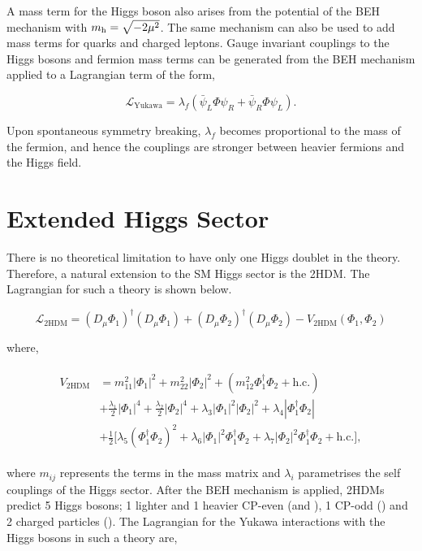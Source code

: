 A mass term for the Higgs boson also arises from the potential of the \ac{BEH} mechanism with $m_{{\text{h}}} = \sqrt{-2\mu^2}$. 
The same mechanism can also be used to add mass terms for quarks and charged leptons.
Gauge invariant couplings to the Higgs bosons and fermion mass terms can be generated from the \ac{BEH} mechanism applied to a Lagrangian term of the form,

\begin{equation}
\mathcal{L}_{\text{Yukawa}} = \lambda_f (\bar{\psi}_{L}\Phi\psi_{R} + \bar{\psi}_{R}\Phi\psi_{L}).
\end{equation}

Upon spontaneous symmetry breaking, $\lambda_{f}$ becomes proportional to the mass of the fermion, and hence the couplings are stronger between heavier fermions and the Higgs field.

\section{Extended Higgs Sector}

There is no theoretical limitation to have only one Higgs doublet in the theory.
Therefore, a natural extension to the \ac{SM} Higgs sector is the \ac{2HDM}.
The Lagrangian for such a theory is shown below.

\begin{equation}
\mathcal{L}_{\text{2HDM}} = (D_\mu \Phi_1)^{\dagger} (D_\mu \Phi_1) + (D_\mu \Phi_2)^{\dagger} (D_\mu \Phi_2) - V_{\text{2HDM}}(\Phi_1 ,\Phi_2)
\end{equation}

where,

\begin{align}
\begin{split}
V_{\text{2HDM}} &= m_{11}^{2}|\Phi_{1}|^2 + m_{22}^{2}|\Phi_{2}|^2 + (m_{12}^{2}\Phi_{1}^{\dagger}\Phi_{2} + \text{h.c.}) \\
&+ \frac{\lambda_1}{2}|\Phi_{1}|^4 + \frac{\lambda_2}{2}|\Phi_{2}|^4 + \lambda_3 |\Phi_{1}|^2 |\Phi_{2}|^2 + \lambda_4  |\Phi_{1}^{\dagger} \Phi_{2}| \\
&+ \frac{1}{2}\Big[ \lambda_5 (\Phi_{1}^{\dagger} \Phi_{2})^{2} + \lambda_6 |\Phi_{1}|^{2} \Phi_{1}^{\dagger} \Phi_{2} +  \lambda_7 |\Phi_{2}|^{2} \Phi_{1}^{\dagger} \Phi_{2} + \text{h.c.} \Big],
\end{split}
\end{align}

where $m_{ij}$ represents the terms in the mass matrix and $\lambda_i$ parametrises the self couplings of the Higgs sector. 
After the \ac{BEH} mechanism is applied, \ac{2HDM}s predict 5 Higgs bosons; 1 lighter and 1 heavier \ac{CP}-even (\Ph and \PH), 1 \ac{CP}-odd (\PA) and 2 charged particles (\PHc).
The Lagrangian for the Yukawa interactions with the Higgs bosons in such a theory are,

